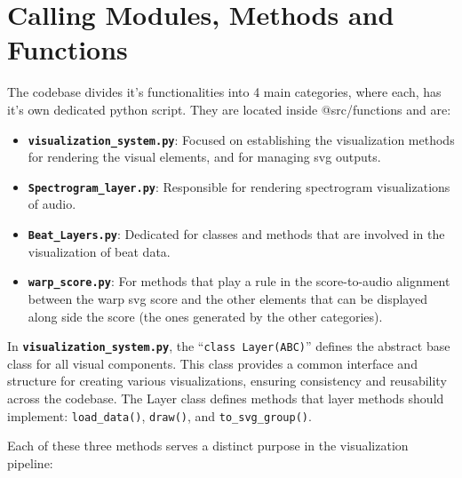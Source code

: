 \section{Calling Modules, Methods and Functions}
The codebase divides it's functionalities into 4 main categories, where each, has it's own dedicated python script. They are located inside @src/functions and are:
\begin{itemize}
    \item \texttt{\textbf{visualization\_system.py}}: Focused on establishing the visualization methods for rendering the visual elements, and for managing svg outputs. 
    \item \texttt{\textbf{Spectrogram\_layer.py}}: Responsible for rendering spectrogram visualizations of audio.
    \item \texttt{\textbf{Beat\_Layers.py}}: Dedicated for classes and methods that are involved in the visualization of beat data.
    \item \texttt{\textbf{warp\_score.py}}: For methods that play a rule in the score-to-audio alignment between the warp svg score and the other elements that can be displayed along side the score (the ones generated by the other categories). 
\end{itemize}

\noindent In \texttt{\textbf{visualization\_system.py}}, the  ``\texttt{class Layer(ABC)}'' defines the abstract base class for all visual components. This class provides a common interface and structure for creating various visualizations, ensuring consistency and reusability across the codebase. The Layer class defines methods that layer methods should implement: \texttt{load\_data()}, \texttt{draw()}, and \texttt{to\_svg\_group()}. 

\noindent Each of these three methods serves a distinct purpose in the visualization pipeline:

